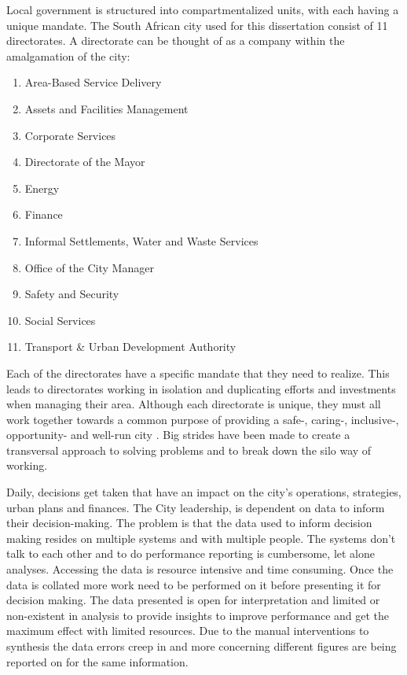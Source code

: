 \documentclass[]{book}
\providecommand{\tightlist}{%
  \setlength{\itemsep}{0pt}\setlength{\parskip}{0pt}}
\theoremstyle{definition}
\theoremstyle{definition}
\theoremstyle{definition}
\theoremstyle{remark}
\begin{document}
Local government is structured into compartmentalized units, with each
having a unique mandate. The South African city used for this
dissertation consist of 11 directorates. A directorate can be thought of
as a company within the amalgamation of the city:

\begin{enumerate}
\def\labelenumi{\arabic{enumi}.}
\tightlist
\item
  Area-Based Service Delivery
\item
  Assets and Facilities Management
\item
  Corporate Services
\item
  Directorate of the Mayor
\item
  Energy
\item
  Finance
\item
  Informal Settlements, Water and Waste Services
\item
  Office of the City Manager
\item
  Safety and Security
\item
  Social Services
\item
  Transport \& Urban Development Authority
\end{enumerate}

Each of the directorates have a specific mandate that they need to
realize. This leads to directorates working in isolation and duplicating
efforts and investments when managing their area. Although each
directorate is unique, they must all work together towards a common
purpose of providing a safe-, caring-, inclusive-, opportunity- and
well-run city . Big strides have been made to create a transversal
approach to solving problems and to break down the silo way of working.

Daily, decisions get taken that have an impact on the city's operations,
strategies, urban plans and finances. The City leadership, is dependent
on data to inform their decision-making. The problem is that the data
used to inform decision making resides on multiple systems and with
multiple people. The systems don't talk to each other and to do
performance reporting is cumbersome, let alone analyses. Accessing the
data is resource intensive and time consuming. Once the data is collated
more work need to be performed on it before presenting it for decision
making. The data presented is open for interpretation and limited or
non-existent in analysis to provide insights to improve performance and
get the maximum effect with limited resources. Due to the manual
interventions to synthesis the data errors creep in and more concerning
different figures are being reported on for the same information.
\end{document}
